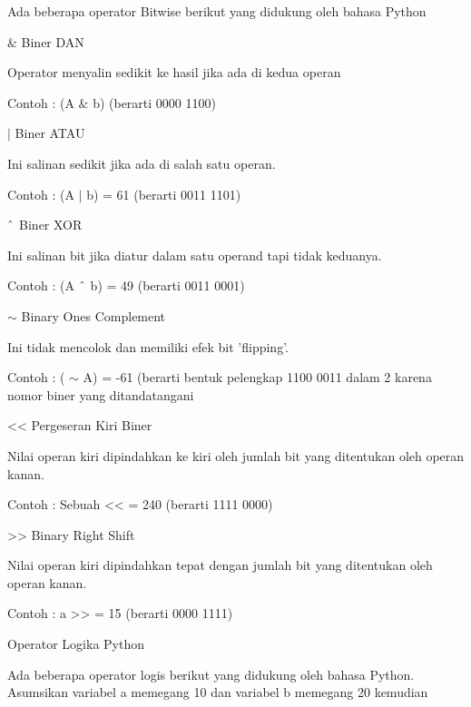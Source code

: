 Ada beberapa operator Bitwise berikut yang didukung oleh bahasa Python \par
\vspace{12pt}
\noindent
 $  \&  $ Biner DAN \par
\noindent
Operator menyalin sedikit ke hasil jika ada di kedua operan \par
\noindent
Contoh : (A  $  \&  $ b) (berarti 0000 1100) \par
\vspace{12pt}
\noindent
 $  \vert  $ $  $Biner ATAU \par
\noindent
Ini salinan sedikit jika ada di salah satu operan. \par
\noindent
Contoh : (A  $  \vert  $ b) = 61 (berarti 0011 1101) \par
\vspace{12pt}
\noindent
 $  \string^  $ Biner XOR \par
\noindent
Ini salinan bit jika diatur dalam satu operand tapi tidak keduanya. \par
\noindent
Contoh : (A  $  \string^  $ b) = 49 (berarti 0011 0001) \par
\vspace{12pt}
\noindent
 $  \sim  $ Binary Ones Complement \par
\noindent
Ini tidak mencolok dan memiliki efek bit 'flipping'. \par
\noindent
Contoh : ( $  \sim  $ A) = -61 (berarti bentuk pelengkap 1100 0011 dalam 2 karena nomor biner yang ditandatangani \par
\vspace{12pt}
\noindent
<< Pergeseran Kiri Biner \par
\noindent
Nilai operan kiri dipindahkan ke kiri oleh jumlah bit yang ditentukan oleh operan kanan. \par
\noindent
Contoh : Sebuah << = 240 (berarti 1111 0000) \par
\vspace{12pt}
\noindent
>> Binary Right Shift \par
\noindent
Nilai operan kiri dipindahkan tepat dengan jumlah bit yang ditentukan oleh operan kanan. \par
\noindent
Contoh : a >> = 15 (berarti 0000 1111) \par
\vspace{12pt}
\noindent
Operator Logika Python \par
\vspace{12pt}
\noindent
Ada beberapa operator logis berikut yang didukung oleh bahasa Python. $  $Asumsikan variabel a memegang 10 dan variabel b memegang 20 kemudian \par
